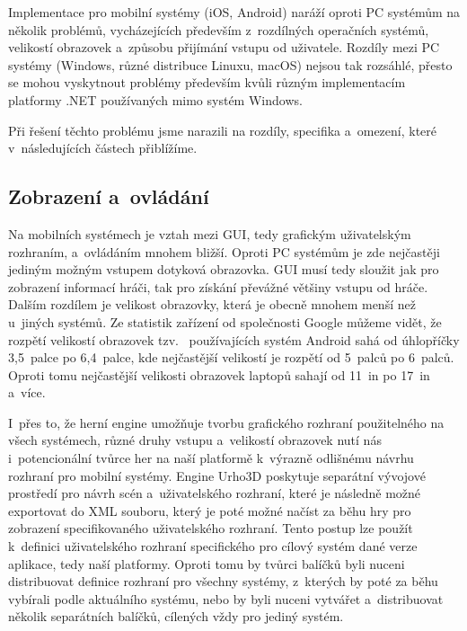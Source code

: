 Implementace pro mobilní systémy (iOS, Android) naráží oproti PC systémům na několik problémů, vycházejících především z~rozdílných operačních systémů, velikostí obrazovek a~způsobu přijímání vstupu od uživatele. Rozdíly mezi PC systémy (Windows, různé distribuce Linuxu, macOS) nejsou tak rozsáhlé, přesto se mohou vyskytnout problémy především kvůli různým implementacím platformy .NET používaných mimo systém Windows.

Při řešení těchto problému jsme narazili na rozdíly, specifika a~omezení, které v~následujících částech přiblížíme.

\subsection{Zobrazení a~ovládání}
Na mobilních systémech je vztah mezi GUI, tedy grafickým uživatelským rozhraním, a~ovládáním mnohem bližší. Oproti PC systémům je zde nejčastěji jediným možným vstupem dotyková obrazovka. GUI musí tedy sloužit jak pro zobrazení informací hráči, tak pro získání převážné většiny vstupu od hráče. Dalším rozdílem je velikost obrazovky, která je obecně mnohem menší než u~jiných systémů. Ze statistik zařízení od společnosti Google \citep{site:materialdesign} můžeme vidět, že rozpětí velikostí obrazovek tzv.~ používajících systém Android sahá od úhlopříčky 3,5~palce po 6,4~palce, kde nejčastější velikostí je rozpětí od 5~palců po 6~palců. Oproti tomu nejčastější velikosti obrazovek laptopů sahají od 11~in po 17~in a~více. 

I~přes to, že herní engine umožňuje tvorbu grafického rozhraní použitelného na všech systémech, různé druhy vstupu a~velikostí obrazovek nutí nás i~potencionální tvůrce her na naší platformě k~výrazně odlišnému návrhu rozhraní pro mobilní systémy. Engine Urho3D poskytuje separátní vývojové prostředí pro návrh scén a~uživatelského rozhraní, které je následně možné exportovat do XML souboru, který je poté možné načíst za běhu hry pro zobrazení specifikovaného uživatelského rozhraní. Tento postup lze použít k~definici uživatelského rozhraní specifického pro cílový systém dané verze aplikace, tedy naší platformy. Oproti tomu by tvůrci balíčků byli nuceni distribuovat definice rozhraní pro všechny systémy, z~kterých by poté za běhu vybírali podle aktuálního systému, nebo by byli nuceni vytvářet a~distribuovat několik separátních balíčků, cílených vždy pro jediný systém. 

